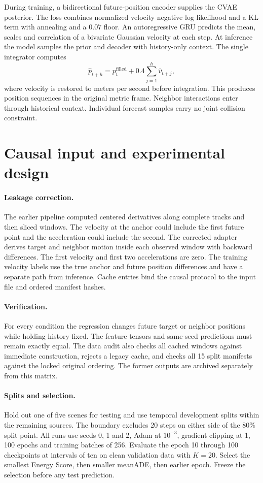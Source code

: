 \documentclass[11pt]{article}
\begin{document}
During training, a bidirectional future-position encoder supplies the CVAE
posterior. The loss combines normalized velocity negative log likelihood and
a KL term with annealing and a 0.07 floor. An autoregressive GRU predicts the
mean, scales and correlation of a bivariate Gaussian velocity at each step.
At inference the model samples the prior and decoder with history-only
context. The single integrator computes
\[
 \hat p_{t+h}=p_t^{\mathrm{filled}} + 0.4\sum_{j=1}^{h} \hat v_{t+j},
\]
where velocity is restored to meters per second before integration. This
produces position sequences in the original metric frame. Neighbor interactions
enter through historical context. Individual forecast samples carry no joint
collision constraint.

\section{Causal input and experimental design}
\paragraph{Leakage correction.}
The earlier pipeline computed centered derivatives along complete tracks and
then sliced windows. The velocity at the anchor could include the first future
point and the acceleration could include the second. The corrected adapter
derives target and neighbor motion inside each observed window with backward
differences. The first velocity and first two accelerations are zero.
The training velocity labels use the true anchor and future position
differences and have a separate path from inference. Cache entries bind the
causal protocol to the input file and ordered manifest hashes.

\paragraph{Verification.}
For every condition the regression changes future target or neighbor
positions while holding history fixed. The feature tensors and same-seed
predictions must remain exactly equal. The data audit also checks all
\CachedWindows{} cached windows against immediate construction, rejects a
legacy cache, and checks all 15 split manifests against the locked original
ordering. The former outputs are archived separately from this matrix.

\paragraph{Splits and selection.}
Hold out one of five scenes for testing and use temporal development splits
within the remaining sources. The boundary excludes 20 steps on either side
of the 80\% split point. All runs use seeds 0, 1 and 2, Adam at $10^{-3}$,
gradient clipping at 1, 100 epochs and training batches of 256.
Evaluate the epoch 10 through 100 checkpoints at intervals of ten on clean
validation data with $K=20$. Select the smallest Energy Score, then smaller
meanADE, then earlier epoch. Freeze the selection before any test prediction.
\end{document}
